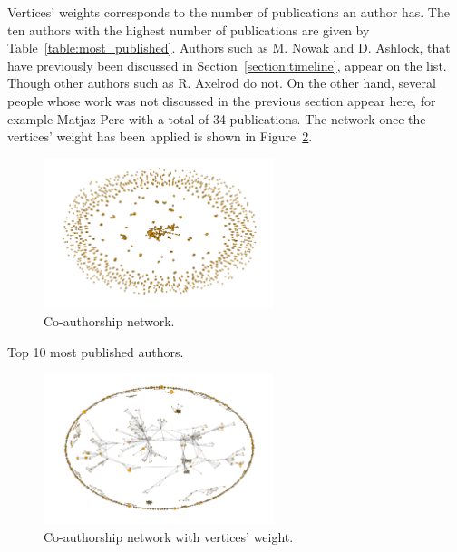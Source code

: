\documentclass{article}
\begin{document}
Vertices' weights corresponds to the number of publications an author has.
The ten authors with the highest number of publications are given
by Table~\ref{table:most_published}. Authors such as M. Nowak and D. Ashlock,
that have previously been discussed in Section~\ref{section:timeline}, appear on
the list. Though other authors such as R. Axelrod do not. On the other hand, 
several people whose work was not discussed in the previous section appear here,
for example Matjaz Perc with a total of 34 publications. The network once the 
vertices' weight has been applied is shown in Figure~\ref{fig:authors_network_weighted}.

\begin{figure}[!hbtp]
    \centering
    \includegraphics[width=0.6\textwidth]{./assets/images/co-authors-network.pdf}
    \caption{Co-authorship network.}\label{fig:authors_network}
\end{figure}

\begin{table}[!hbtp]
    \begin{center}
    
    \end{center}
    \caption{Top 10 most published authors.}
    \label{table:most_published}
\end{table}

\begin{figure}[!hbtp]
    \centering
    \includegraphics[width=0.6\textwidth]{./assets/images/co-authors-network-weight.pdf}
    \caption{Co-authorship network with vertices' weight.}
    \label{fig:authors_network_weighted}
\end{figure}
\end{document}
